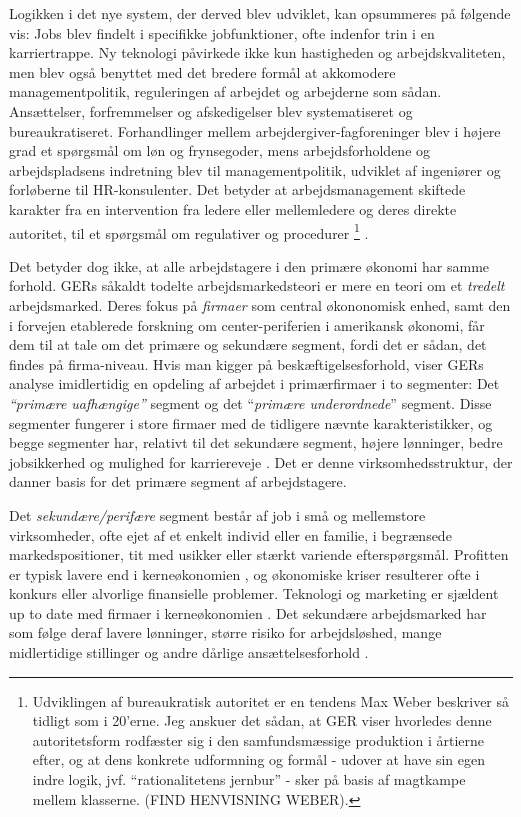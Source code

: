 Logikken i det nye system, der derved blev udviklet, kan opsummeres på følgende vis: Jobs blev findelt i specifikke jobfunktioner, ofte indenfor trin i en karriertrappe. Ny teknologi påvirkede ikke kun hastigheden og arbejdskvaliteten, men blev også benyttet med det bredere formål at akkomodere managementpolitik, reguleringen af arbejdet og arbejderne som sådan. Ansættelser, forfremmelser og afskedigelser blev systematiseret og bureaukratiseret. Forhandlinger mellem arbejdergiver-fagforeninger blev i højere grad et spørgsmål om løn og frynsegoder, mens arbejdsforholdene og arbejdspladsens indretning blev til managementpolitik, udviklet af ingeniører og forløberne til HR-konsulenter. Det betyder at arbejdsmanagement skiftede karakter fra en intervention fra ledere eller mellemledere og deres direkte autoritet, til et spørgsmål om regulativer og procedurer \parencite[189]{Gordon1982}%
%
\footnote{Udviklingen af bureaukratisk autoritet er en tendens Max Weber beskriver så tidligt som i 20'erne. Jeg anskuer det sådan, at GER viser hvorledes denne autoritetsform rodfæster sig i den samfundsmæssige produktion i årtierne efter, og at dens konkrete udformning og formål - udover at have sin egen indre logik, jvf. “rationalitetens jernbur” - sker på basis af magtkampe mellem klasserne. (FIND HENVISNING WEBER).}%
%
. 

Det betyder dog ikke, at alle arbejdstagere i den primære økonomi har samme forhold. GERs såkaldt todelte arbejdsmarkedsteori er mere en teori om et \emph{tredelt} arbejdsmarked. Deres fokus på \emph{firmaer} som central økononomisk enhed, samt den i forvejen etablerede forskning om center-periferien i amerikansk økonomi, får dem til at tale om det primære og sekundære segment, fordi det er sådan, det findes på firma-niveau. Hvis man kigger på beskæftigelsesforhold, viser GERs analyse imidlertidig en opdeling af arbejdet i primærfirmaer i to segmenter: Det \emph{“primære uafhængige”} segment og det “\emph{primære underordnede}” segment. Disse segmenter fungerer i store firmaer med de tidligere nævnte karakteristikker, og begge segmenter har, relativt til det sekundære segment, højere lønninger, bedre jobsikkerhed og mulighed for karriereveje \parencite[202]{Gordon1982} \label{GERs tre segmenter}. Det er denne virksomhedsstruktur, der danner basis for det primære segment af arbejdstagere.

Det \emph{sekundære/perifære} segment består af job i små og mellemstore virksomheder, ofte ejet af et enkelt individ eller en familie, i begrænsede markedspositioner, tit med usikker eller stærkt variende efterspørgsmål. Profitten er typisk lavere end i kerneøkonomien
, og økonomiske kriser resulterer ofte i konkurs eller alvorlige finansielle problemer. Teknologi og marketing er sjældent up to date med firmaer i kerneøkonomien \parencite[7]{Averitt1968}. Det sekundære arbejdsmarked har som følge deraf lavere lønninger, større risiko for arbejdsløshed, mange midlertidige  stillinger og andre dårlige ansættelsesforhold \parencite[70f]{Doeringer1971}.

